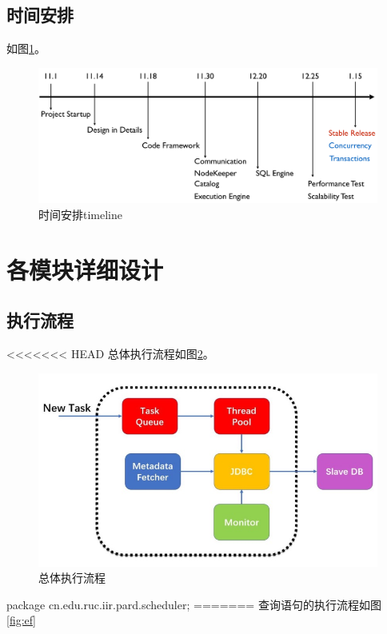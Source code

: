\documentclass[a4paper, 12pt]{ctexart}
\begin{document}
\subsection{时间安排}
如图\ref{fig:tl}。

\begin{figure}[htbp]
	\centering
	\includegraphics[width=\linewidth]{figure/timeline.png}
	\caption{时间安排timeline}
	\label{fig:tl}
\end{figure}

\section{各模块详细设计}
\subsection{执行流程}
<<<<<<< HEAD
总体执行流程如图\ref{fig:exec-flow}。

\begin{figure}[htbp]
	\centering
	\includegraphics[width=\linewidth]{figure/exec-flow.png}
	\caption{总体执行流程}
	\label{fig:exec-flow}
\end{figure}


package cn.edu.ruc.iir.pard.scheduler;
=======
查询语句的执行流程如图\ref{fig:ef}
\end{document}
